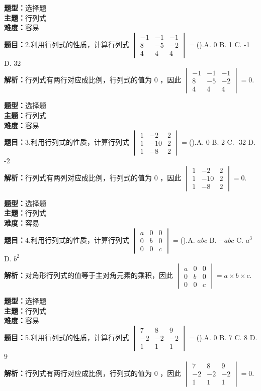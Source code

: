 \documentclass{ctexart}
\newenvironment{question}[5]{%
	\noindent\textbf{题型：}#1\\
	\textbf{主题：}#2\\
	\textbf{难度：}#3\\
	\textbf{题目：}#4\\
	\textbf{解析：}#5\\
	\vspace{1em}
}{}
\begin{document}
	\begin{question}
		{选择题}
		{行列式}
		{容易}
		{2.利用行列式的性质，计算行列式 \(\begin{vmatrix}-1 & -1 & -1 \\ 8 & -5 & -2 \\ 4 & 4 & 4\end{vmatrix}=\)().A. 0 B. 1 C. -1 D. 32}
		{行列式有两行对应成比例，行列式的值为 0 ，因此 \(\begin{vmatrix}-1 & -1 & -1 \\ 8 & -5 & -2 \\ 4 & 4 & 4\end{vmatrix}=0\).}
	\end{question}
	
	\begin{question}
		{选择题}
		{行列式}
		{容易}
		{3.利用行列式的性质，计算行列式 \(\begin{vmatrix}1 & -2 & 2 \\ 1 & -10 & 2 \\ 1 & -8 & 2\end{vmatrix}=\)().A. 0 B. 2 C. -32 D. -2}
		{行列式有两列对应成比例，行列式的值为 0 ，因此 \(\begin{vmatrix}1 & -2 & 2 \\ 1 & -10 & 2 \\ 1 & -8 & 2\end{vmatrix}=0\).}
	\end{question}
	
	\begin{question}
		{选择题}
		{行列式}
		{容易}
		{4.利用行列式的性质，计算行列式 \(\begin{vmatrix}a & 0 & 0 \\ 0 & b & 0 \\ 0 & 0 & c\end{vmatrix}=\)().A. \(abc\) B. \(-abc\) C. \(a^3\) D. \(b^2\)}
		{对角形行列式的值等于主对角元素的乘积，因此 \(\begin{vmatrix}a & 0 & 0 \\ 0 & b & 0 \\ 0 & 0 & c\end{vmatrix}=a \times b \times c\).}
	\end{question}
	
	\begin{question}
		{选择题}
		{行列式}
		{容易}
		{5.利用行列式的性质，计算行列式 \(\begin{vmatrix}7 & 8 & 9 \\ -2 & -2 & -2 \\ 1 & 1 & 1\end{vmatrix}=\)().A. 0 B. 7 C. 8 D. 9}
		{行列式有两行对应成比例，行列式的值为 0 ，因此 \(\begin{vmatrix}7 & 8 & 9 \\ -2 & -2 & -2 \\ 1 & 1 & 1\end{vmatrix}=0\).}
	\end{question}
	
\end{document}
